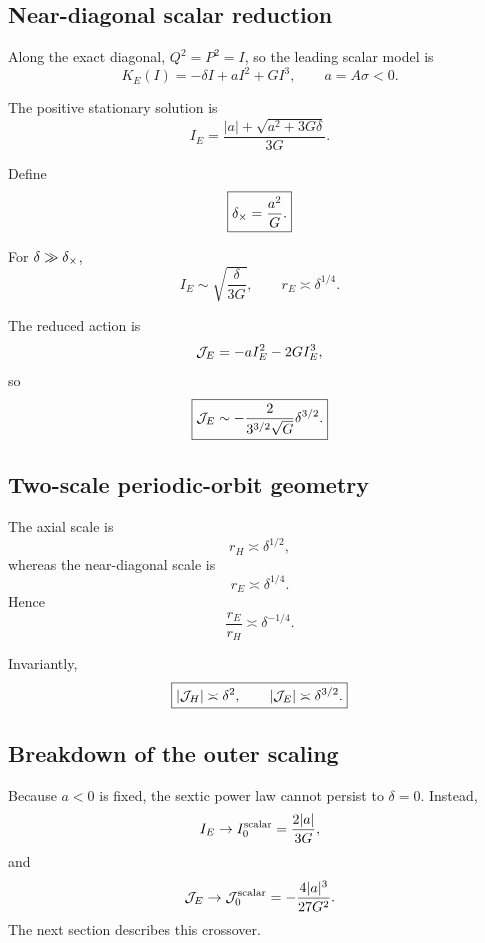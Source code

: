 \subsection{Near-diagonal scalar reduction}

Along the exact diagonal, \(Q^2=P^2=I\), so the leading scalar model is
\begin{equation}
\boxed{
K_E(I)
=
-\delta I+aI^2+GI^3,
\qquad
a=A\sigma<0.
}
\label{eq:diagonal-scalar}
\end{equation}

The positive stationary solution is
\begin{equation}
\boxed{
I_E
=
\frac{|a|+\sqrt{a^2+3G\delta}}{3G}.
}
\label{eq:IE}
\end{equation}

Define
\begin{equation}
\boxed{
\delta_\times=\frac{a^2}{G}.
}
\label{eq:crossover-scale}
\end{equation}

For \(\delta\gg\delta_\times\),
\[
I_E\sim\sqrt{\frac{\delta}{3G}},
\qquad
r_E\asymp\delta^{1/4}.
\]

The reduced action is
\[
\mathcal{J}_E=-aI_E^2-2GI_E^3,
\]
so
\begin{equation}
\boxed{
\mathcal{J}_E
\sim
-\frac{2}{3^{3/2}\sqrt G}\delta^{3/2}.
}
\label{eq:elliptic-action-scaling}
\end{equation}

\subsection{Two-scale periodic-orbit geometry}

The axial scale is
\[
r_H\asymp\delta^{1/2},
\]
whereas the near-diagonal scale is
\[
r_E\asymp\delta^{1/4}.
\]
Hence
\[
\frac{r_E}{r_H}\asymp\delta^{-1/4}.
\]

Invariantly,
\[
\boxed{
|\mathcal{J}_H|\asymp\delta^2,
\qquad
|\mathcal{J}_E|\asymp\delta^{3/2}.
}
\]

\subsection{Breakdown of the outer scaling}

Because \(a<0\) is fixed, the sextic power law cannot persist to \(\delta=0\). Instead,
\[
I_E\to I_0^{\rm scalar}
=
\frac{2|a|}{3G},
\]
and
\[
\mathcal{J}_E\to
\mathcal{J}_0^{\rm scalar}
=
-\frac{4|a|^3}{27G^2}.
\]
The next section describes this crossover.
